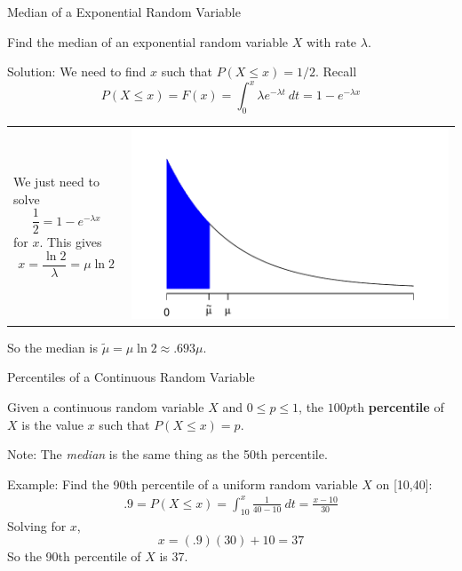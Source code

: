 \documentclass{beamer}
\renewcommand{\emph}{\textbf}
\begin{document}
\begin{frame}{Median of a Exponential Random Variable}
\begin{block}{}
Find the median of an exponential random variable $X$ with rate $\lambda$.
\end{block}
\pause Solution: We need to find $x$ such that $P(X \leq x)=1/2$. \pause Recall
$$P(X \leq x) = F(x) = \int_0^x \lambda e^{-\lambda t}\ dt = 1-e^{-\lambda x}$$

\vspace{-.2cm}
\begin{tabular}{p{4.5cm}p{6cm}}
\vspace{0cm}
\pause We just need to solve
$$\frac12 = 1-e^{-\lambda x}$$
for $x$. \pause This gives $$x=\frac{\ln 2}{\lambda} = \mu\ln 2$$
\pause 
&\vspace{-.4cm}\includegraphics[scale=.55]{ch4_cdf_exp2.pdf}
\end{tabular}

\vspace{-.2cm}
So the median is $\tilde\mu = \mu\ln 2 \approx .693 \mu$.
\end{frame}

\begin{frame}{Percentiles of a Continuous Random Variable}
\begin{block}{}
Given a continuous random variable $X$ and $0\leq p\leq 1$, the $100p$th \emph{percentile} of $X$ is the value $x$ such that $P(X \leq x)=p$.
\end{block}
Note: The \textit{median} is the same thing as the 50th percentile.

\vspace{.2cm}
\pause Example: Find the 90th percentile of a uniform random variable $X$ on [10,40]:
\pause \begin{align*}
.9 = P(X\leq x) = \int_{10}^x \frac1{40-10}\ dt = \frac{x-10}{30}
\end{align*}
\pause Solving for $x$,
$$x=(.9)(30)+10 = 37$$
\pause So the 90th percentile of $X$ is 37.
\end{frame}
\end{document}
